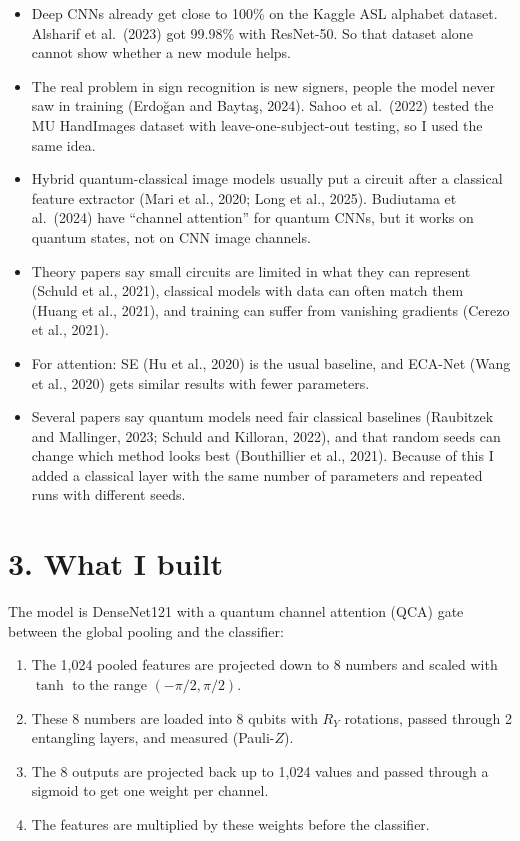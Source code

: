 \documentclass[11pt,a4paper]{article}
\begin{document}
\begin{itemize}
  \item Deep CNNs already get close to 100\% on the Kaggle ASL alphabet
        dataset. Alsharif et al.\ (2023) got 99.98\% with ResNet-50. So that
        dataset alone cannot show whether a new module helps.
  \item The real problem in sign recognition is new signers, people the
        model never saw in training (Erdo\u{g}an and Bayta\c{s}, 2024). Sahoo
        et al.\ (2022) tested the MU HandImages dataset with
        leave-one-subject-out testing, so I used the same idea.
  \item Hybrid quantum-classical image models usually put a circuit after a
        classical feature extractor (Mari et al., 2020; Long et al., 2025).
        Budiutama et al.\ (2024) have ``channel attention'' for quantum CNNs,
        but it works on quantum states, not on CNN image channels.
  \item Theory papers say small circuits are limited in what they can
        represent (Schuld et al., 2021), classical models with data can often
        match them (Huang et al., 2021), and training can suffer from
        vanishing gradients (Cerezo et al., 2021).
  \item For attention: SE (Hu et al., 2020) is the usual baseline, and
        ECA-Net (Wang et al., 2020) gets similar results with fewer
        parameters.
  \item Several papers say quantum models need fair classical baselines
        (Raubitzek and Mallinger, 2023; Schuld and Killoran, 2022), and that
        random seeds can change which method looks best (Bouthillier et al.,
        2021). Because of this I added a classical layer with the same number
        of parameters and repeated runs with different seeds.
\end{itemize}

\section*{3. What I built}

The model is DenseNet121 with a quantum channel attention (QCA) gate between
the global pooling and the classifier:

\begin{enumerate}
  \item The 1,024 pooled features are projected down to 8 numbers and scaled
        with $\tanh$ to the range $(-\pi/2, \pi/2)$.
  \item These 8 numbers are loaded into 8 qubits with $R_Y$ rotations, passed
        through 2 entangling layers, and measured (Pauli-$Z$).
  \item The 8 outputs are projected back up to 1,024 values and passed
        through a sigmoid to get one weight per channel.
  \item The features are multiplied by these weights before the classifier.
\end{enumerate}
\end{document}
